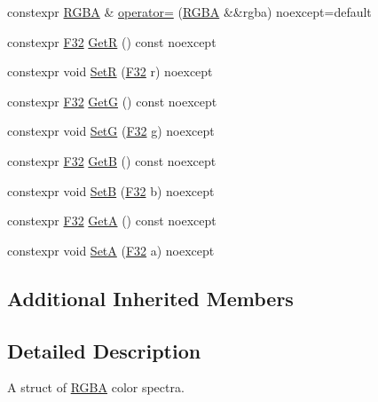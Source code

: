 \begin{DoxyCompactItemize}
\item 
constexpr \mbox{\hyperlink{structmage_1_1_r_g_b_a}{R\+G\+BA}} \& \mbox{\hyperlink{structmage_1_1_r_g_b_a_a66f6476166086849d031b99b458e6f7c}{operator=}} (\mbox{\hyperlink{structmage_1_1_r_g_b_a}{R\+G\+BA}} \&\&rgba) noexcept=default
\item 
constexpr \mbox{\hyperlink{namespacemage_aa97e833b45f06d60a0a9c4fc22ae02c0}{F32}} \mbox{\hyperlink{structmage_1_1_r_g_b_a_a2f312fc862e792247bb6ba0e5a5390ca}{GetR}} () const noexcept
\item 
constexpr void \mbox{\hyperlink{structmage_1_1_r_g_b_a_a1de1796391b58e1e1db1e2701f8a391c}{SetR}} (\mbox{\hyperlink{namespacemage_aa97e833b45f06d60a0a9c4fc22ae02c0}{F32}} r) noexcept
\item 
constexpr \mbox{\hyperlink{namespacemage_aa97e833b45f06d60a0a9c4fc22ae02c0}{F32}} \mbox{\hyperlink{structmage_1_1_r_g_b_a_a39db7aa6065db1aef0c774316865e0ae}{GetG}} () const noexcept
\item 
constexpr void \mbox{\hyperlink{structmage_1_1_r_g_b_a_a18cdea53caccd27337bd0a1c31208b64}{SetG}} (\mbox{\hyperlink{namespacemage_aa97e833b45f06d60a0a9c4fc22ae02c0}{F32}} g) noexcept
\item 
constexpr \mbox{\hyperlink{namespacemage_aa97e833b45f06d60a0a9c4fc22ae02c0}{F32}} \mbox{\hyperlink{structmage_1_1_r_g_b_a_ae4fd67f400f6c86c5c7614ba3b06feeb}{GetB}} () const noexcept
\item 
constexpr void \mbox{\hyperlink{structmage_1_1_r_g_b_a_a3c7dccbc089f0a190f470c9dc74e7c51}{SetB}} (\mbox{\hyperlink{namespacemage_aa97e833b45f06d60a0a9c4fc22ae02c0}{F32}} b) noexcept
\item 
constexpr \mbox{\hyperlink{namespacemage_aa97e833b45f06d60a0a9c4fc22ae02c0}{F32}} \mbox{\hyperlink{structmage_1_1_r_g_b_a_a31196d863851f8e2b178458a78702b42}{GetA}} () const noexcept
\item 
constexpr void \mbox{\hyperlink{structmage_1_1_r_g_b_a_a3b2ebef3e0f2d26707b0fb84de8aec12}{SetA}} (\mbox{\hyperlink{namespacemage_aa97e833b45f06d60a0a9c4fc22ae02c0}{F32}} a) noexcept
\end{DoxyCompactItemize}
\subsection*{Additional Inherited Members}


\subsection{Detailed Description}
A struct of \mbox{\hyperlink{structmage_1_1_r_g_b_a}{R\+G\+BA}} color spectra. 

